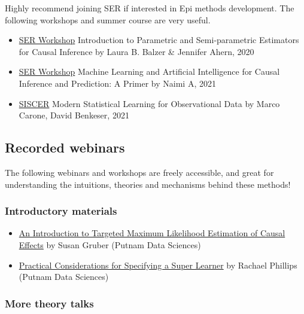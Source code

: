 \documentclass[
]{book}
\providecommand{\tightlist}{%
  \setlength{\itemsep}{0pt}\setlength{\parskip}{0pt}}
\begin{document}
Highly recommend joining SER if interested in Epi methods development. The following workshops and summer course are very useful.

\begin{itemize}
\tightlist
\item
  \href{https://epiresearch.org/}{SER Workshop} Introduction to Parametric and Semi-parametric Estimators for Causal Inference by Laura B. Balzer \& Jennifer Ahern, 2020
\item
  \href{https://epiresearch.org/}{SER Workshop} Machine Learning and Artificial Intelligence for Causal Inference and Prediction: A Primer by Naimi A, 2021
\item
  \href{https://si.biostat.washington.edu/suminst/archives/SISCER2021/CR2106}{SISCER} Modern Statistical Learning for Observational Data by Marco Carone, David Benkeser, 2021
\end{itemize}

\hypertarget{recorded-webinars}{%
\subsection{Recorded webinars}\label{recorded-webinars}}

The following webinars and workshops are freely accessible, and great for understanding the intuitions, theories and mechanisms behind these methods!

\hypertarget{introductory-materials}{%
\subsubsection{Introductory materials}\label{introductory-materials}}

\begin{itemize}
\tightlist
\item
  \href{https://www.youtube.com/watch?v=8Q9dfW3oOi4}{An Introduction to Targeted Maximum Likelihood Estimation of Causal Effects} by Susan Gruber (Putnam Data Sciences)
\item
  \href{https://www.youtube.com/watch?v=WYnjja8DKPg}{Practical Considerations for Specifying a Super Learner} by Rachael Phillips (Putnam Data Sciences)
\end{itemize}

\hypertarget{more-theory-talks}{%
\subsubsection{More theory talks}\label{more-theory-talks}}
\end{document}

